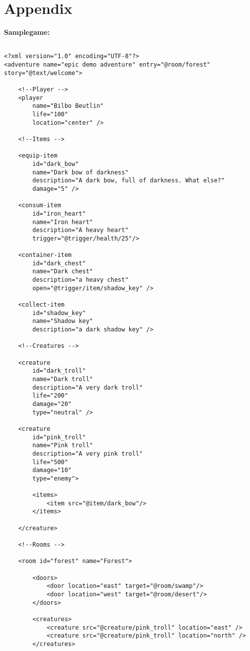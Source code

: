 \chapter{Appendix}
\textbf{Samplegame:}
\lstset{language=XML}
\begin{lstlisting}

<?xml version="1.0" encoding="UTF-8"?>
<adventure name="epic demo adventure" entry="@room/forest" story="@text/welcome">

    <!--Player -->
    <player 
        name="Bilbo Beutlin"
        life="100"
        location="center" />

    <!--Items -->
    
    <equip-item
        id="dark_bow"
        name="Dark bow of darkness"
        description="A dark bow, full of darkness. What else?"
        damage="5" />

    <consum-item
        id="iron_heart"
        name="Iron heart"
        description="A heavy heart"
        trigger="@trigger/health/25"/>

    <container-item
        id="dark_chest"
        name="Dark chest"
        description="a heavy chest"
        open="@trigger/item/shadow_key" />

    <collect-item
        id="shadow_key"
        name="Shadow key"
        description="a dark shadow key" />

    <!--Creatures -->

    <creature
        id="dark_troll"
        name="Dark troll"
        description="A very dark troll" 
        life="200"
        damage="20"
        type="neutral" />

    <creature
        id="pink_troll"
        name="Pink troll"
        description="A very pink troll"
        life="500"
        damage="10"
        type="enemy">
        
        <items>
            <item src="@item/dark_bow"/>
        </items>

    </creature>
       
    <!--Rooms -->

    <room id="forest" name="Forest">

        <doors>
            <door location="east" target="@room/swamp"/>
            <door location="west" target="@room/desert"/>
        </doors>

        <creatures>
            <creature src="@creature/pink_troll" location="east" />
            <creature src="@creature/pink_troll" location="north" />
        </creatures>


\end{lstlisting}
